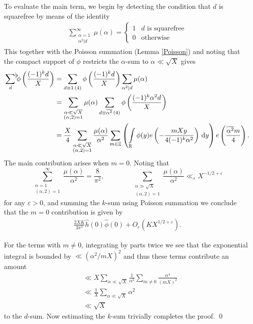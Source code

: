 \documentclass[a4paper,10pt,twoside]{amsart}
\theoremstyle{definition}
\numberwithin{equation}{section}
\newcommand\R{\mathbb{R}}
\newcommand\eps{\varepsilon}
\renewcommand\:{\colon}
\newcommand{\sumflat}{\mathop{{\sum}^{\raisebox{-3pt}{\makebox[0pt][l]{$\flat$}}}}}
\begin{document}
To evaluate the main term, we begin by detecting the condition that $d$ is squarefree by means of the identity
\begin{align}\label{squarefree-detection} 
\sum_{\substack{\alpha=1\\
\alpha^2|d}}^\infty\mu(\alpha)=\begin{cases}
1 & d\text{ is squarefree}\\
0 & \text{otherwise}
\end{cases}
\end{align}
This together with the Poisson summation (Lemma \ref{Poisson}) and noting that the compact support of $\phi$ restricts the $\alpha$-sum to $\alpha\ll \sqrt X$ gives
\begin{align*}
\sumflat_d\phi\left(\frac{(-1)^kd}X\right)&=\sum_{d\equiv 1\,(4)}\phi\left(\frac{(-1)^kd}X\right)\sum_{\alpha^2|d}\mu(\alpha) \\
&=\sum_{\substack{\alpha\ll\sqrt X\\
(\alpha,2)=1}}\mu(\alpha)\sum_{d\equiv\overline{\alpha^2}\,(4)}\phi\left(\frac{(-1)^k\alpha^2d}X \right)\\
&=\frac X{4}\sum_{\substack{\alpha\ll\sqrt X\\
(\alpha,2)=1}}\frac{\mu(\alpha)}{\alpha^2}\sum_{m\in\mathbb Z}\left(\int\limits_\R\phi(y)e\left(-\frac{mXy}{4(-1)^k\alpha^2}\right)\,\mathrm d y\right)e\left(\frac{\overline{\alpha^2}m}{4}\right).
\end{align*}
The main contribution arises when $m=0$. Noting that 
\[
\sum_{\substack{\alpha=1\\
(\alpha,2)=1}}^\infty\frac{\mu(\alpha)}{\alpha^2}=\frac8{\pi^2},\qquad\qquad\sum_{\substack{\alpha\gg\sqrt X\\
(\alpha,2)=1}}\frac{\mu(\alpha)}{\alpha^2}\ll_\eps X^{-1/2+\eps}\]
for any $\eps>0$, and summing the $k$-sum using Poisson summation we conclude that the $m=0$ contribution is given by 
\begin{align}\label{main-term}
\frac {2XK}{3\pi^2}\widehat h(0)\widehat\phi(0)+O_\eps\left(KX^{1/2+\eps}\right).
\end{align}

For the terms with $m\neq 0$, integrating by parts twice we see that the exponential integral is bounded by $\ll (\alpha^2/mX)^2$ and thus these terms contribute an amount
\begin{align*}
&\ll X\sum_{\alpha\ll\sqrt X}\frac1{\alpha^2}\sum_{m\neq 0}\frac{\alpha^4}{(mX)^2}\\
&\ll\frac 1X\sum_{\alpha\ll\sqrt X}\alpha^2\\
&\ll\sqrt X
\end{align*}
to the $d$-sum. Now estimating the $k$-sum trivially completes the proof. \qed
\end{document}
